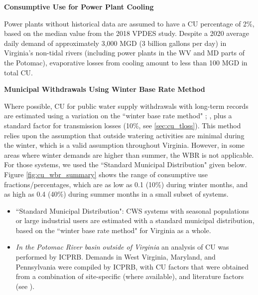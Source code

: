 \begin{multicols}{2}


\noindent \textbf{Consumptive Use for Power Plant Cooling}\smallskip
\label{sec:cu_power}

\noindent Power plants without historical data are assumed to have a CU percentage of 2\%, based on the median value from the 2018 VPDES study. Despite a 2020 average daily demand of approximately 3,000 MGD (3 billion gallons per day) in Virginia's non-tidal rivers (including power plants in the WV and MD parts of the Potomac), evaporative losses from cooling amount to less than 100 MGD in total CU.\bigskip 

\noindent \textbf{Municipal Withdrawals Using Winter Base Rate Method}\medskip
\label{sec:cu_wbr}

\noindent Where possible, CU for public water supply withdrawals with long-term records are estimated using a variation on the ``winter base rate method" \cite{Ducnuigeen2015}; \cite{Li2017}, plus a standard factor for transmission losses (10\%, see \ref{sec:cu_tloss}). This method relies upon the assumption that outside watering activities are minimal during the winter, which is a valid assumption throughout Virginia. However, in some areas where winter demands are higher than summer, the WBR is not applicable. For those systems, we used the ``Standard Municipal Distribution" given below.  Figure \ref{fig:cu_wbr_summary} shows the range of consumptive use fractions/percentages, which are as low as 0.1 (10\%) during winter months, and as high as 0.4 (40\%) during summer months in a small subset of systems.  

\begin{itemize}
    \item ``Standard Municipal Distribution": CWS systems with seasonal populations or large industrial users are estimated with a standard municipal distribution, based on the ``winter base rate method" for Virginia as a whole. 
    \item \emph{In the Potomac River basin outside of Virginia} an analysis of CU was performed by ICPRB.  Demands in West Virginia, Maryland, and Pennsylvania were compiled by ICPRB, with CU factors that were obtained from a combination of site-specific (where available), and literature factors (see \cite{icprb2020}).
\end{itemize}

\end{multicols}

